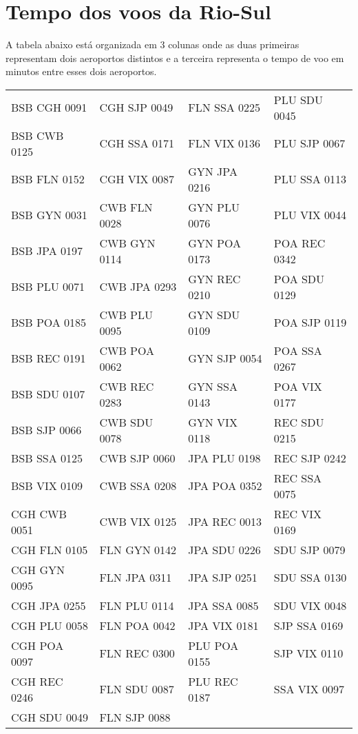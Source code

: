 \chapter{Tempo dos voos da Rio-Sul}\label{anx:timeriosul}

A tabela abaixo está organizada em 3 colunas onde as duas primeiras representam
dois aeroportos distintos e a terceira representa o tempo de voo em minutos
entre esses dois aeroportos.

\begin{scriptsize}

\begin{longtable}{l l l l}


BSB CGH 0091 & CGH SJP 0049 & FLN SSA 0225 & PLU SDU 0045 \\
BSB CWB 0125 & CGH SSA 0171 & FLN VIX 0136 & PLU SJP 0067 \\
BSB FLN 0152 & CGH VIX 0087 & GYN JPA 0216 & PLU SSA 0113 \\
BSB GYN 0031 & CWB FLN 0028 & GYN PLU 0076 & PLU VIX 0044 \\
BSB JPA 0197 & CWB GYN 0114 & GYN POA 0173 & POA REC 0342 \\
BSB PLU 0071 & CWB JPA 0293 & GYN REC 0210 & POA SDU 0129 \\
BSB POA 0185 & CWB PLU 0095 & GYN SDU 0109 & POA SJP 0119 \\
BSB REC 0191 & CWB POA 0062 & GYN SJP 0054 & POA SSA 0267 \\
BSB SDU 0107 & CWB REC 0283 & GYN SSA 0143 & POA VIX 0177 \\
BSB SJP 0066 & CWB SDU 0078 & GYN VIX 0118 & REC SDU 0215 \\
BSB SSA 0125 & CWB SJP 0060 & JPA PLU 0198 & REC SJP 0242 \\
BSB VIX 0109 & CWB SSA 0208 & JPA POA 0352 & REC SSA 0075 \\
CGH CWB 0051 & CWB VIX 0125 & JPA REC 0013 & REC VIX 0169 \\
CGH FLN 0105 & FLN GYN 0142 & JPA SDU 0226 & SDU SJP 0079 \\
CGH GYN 0095 & FLN JPA 0311 & JPA SJP 0251 & SDU SSA 0130 \\
CGH JPA 0255 & FLN PLU 0114 & JPA SSA 0085 & SDU VIX 0048 \\
CGH PLU 0058 & FLN POA 0042 & JPA VIX 0181 & SJP SSA 0169 \\
CGH POA 0097 & FLN REC 0300 & PLU POA 0155 & SJP VIX 0110 \\
CGH REC 0246 & FLN SDU 0087 & PLU REC 0187 & SSA VIX 0097 \\
CGH SDU 0049 & FLN SJP 0088 & & \\


\end{longtable}

\end{scriptsize}